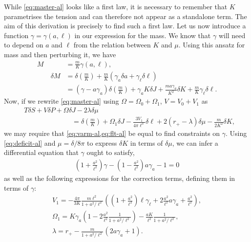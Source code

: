 \documentclass[
twoside,
openright,
frontopenright,
]{dmathesis}
\newcommand{\nn}{\nonumber}
\begin{document}
While \cref{eq:master-al} looks like a first law, it is necessary to remember
that $K$ parametrises the tension and can therefore not appear as a standalone
term. The aim of this derivation is precisely to find such a first law. Let us
now introduce a function $\gamma = \gamma(a,\ell)$ in our expression for the
mass. We know that $\gamma$ will need to depend on $a$ and $\ell$ from the
relation between $K$ and $\mu$. Using this ansatz for mass and then perturbing
it, we have
\begin{align}  
  M&=\frac{m}{K}\gamma(a,\ell),\\
  \qquad \delta M &= \delta \left(\frac{m}{K}\right) +\frac{m}{K}(\gamma_{a}
                    \delta a + \gamma_{\ell}\delta\ell)\nn\\
   &= (\gamma - a\gamma_{a})\delta \left(\frac{m}{K}\right) +
     \gamma_{a}K\delta J + \frac{m a \gamma_{a}}{K^{2}}\delta K +
     \frac{m}{K}\gamma_{\ell}\delta \ell.
     \label{eq:varm-al}
\end{align}
Now, if we rewrite \cref{eq:master-al} using $\Omega = \Omega_0+\Omega_1$,
$V = V_0 + V_1$ as
\begin{align}
  \label{eq:flt-al}
  &T\delta S + V\delta P + \Omega \delta J - 2\lambda \delta \mu\nn\\
  &\hspace{7em}= \delta
  \left(\frac{m}{K}\right) + \Omega_1\delta J -\frac{3V_1}{4\pi \ell^3}\delta
  \ell + 2(r_+-\lambda)\delta\mu -\frac{m}{2K^2}\delta K,
\end{align}
we may require that \cref{eq:varm-al,eq:flt-al} be equal to find constraints on
$\gamma$. Using \cref{eq:deficit-al} and $\mu=\delta/8\pi$ to express $\delta K$
in terms of $\delta \mu$, we can infer a differential equation that $\gamma$
ought to satisfy,
\begin{align}\label{eq:eq1al}
\left(1+\frac{a^2}{\ell^2}\right)\gamma-
  \left(1-\frac{a^{2}}{\ell^{2}}\right)a\gamma_{a}-1=0 
\end{align}
as well as the following expressions for the correction terms, defining them in
terms of $\gamma$:
\begin{gather}
V_1=-\frac{4\pi}{3K}\frac{m
  \ell^2}{1+a^2/\ell^2}\left(\left(1+\frac{a^2}{\ell^2}\right)
  \ell\gamma_{\ell}+2\frac{a^2}{\ell^2}a
  \gamma_{a}+\frac{a^2}{\ell^2}\right),\nn\\  
\Omega_1=K\gamma_{a}\left(1-2\frac{a^2}{\ell^2}\frac{1}{1+a^2/\ell^2}\right)-
\frac{aK}{\ell^2}\frac{1}{1+a^2/\ell^2},\nn\\ 
\lambda=r_+-\frac{m}{1+a^2/\ell^2}\left(2a\gamma_{a}+1\right). 
\end{gather}
\end{document}
